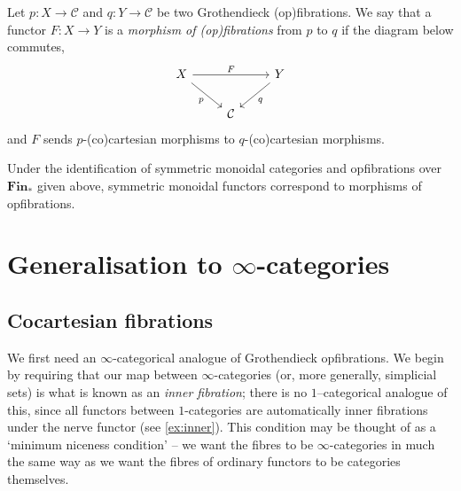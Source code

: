 \documentclass{MetricNotes2023}
\begin{document}
\begin{definition}
Let \(p : X \to \mathcal{C}\) and \(q : Y \to \mathcal{C}\) be two Grothendieck (op)fibrations. We say that a functor \(F : X \to Y\) is a \textit{morphism of (op)fibrations} from \(p\) to \(q\) if the diagram below commutes,
\[\begin{tikzcd}
X \arrow[rd, swap, "p"] \arrow[rr, "F"]  & & Y \arrow[ld, "q"]  \\
& \mathcal{C}  & 
\end{tikzcd}\]
and \(F\) sends \(p\)-(co)cartesian morphisms to \(q\)-(co)cartesian morphisms. 
\end{definition}

\begin{proposition}
Under the identification of symmetric monoidal categories and opfibrations over \(\textbf{Fin}_*\) given above, symmetric monoidal functors correspond to morphisms of opfibrations.
\end{proposition}

\section{Generalisation to \(\infty\)-categories}


\subsection{Cocartesian fibrations}

We first need an \(\infty\)-categorical analogue of Grothendieck opfibrations. We begin by requiring that our map between \(\infty\)-categories (or, more generally, simplicial sets) is what is known as an \textit{inner fibration}; there is no \(1\)--categorical analogue of this, since all functors between \(1\)-categories are automatically inner fibrations under the nerve functor (see \ref{ex:inner}). This condition may be thought of as a `minimum niceness condition' -- we want the fibres to be \(\infty\)-categories in much the same way as we want the fibres of ordinary functors to be categories themselves. 
\end{document}
